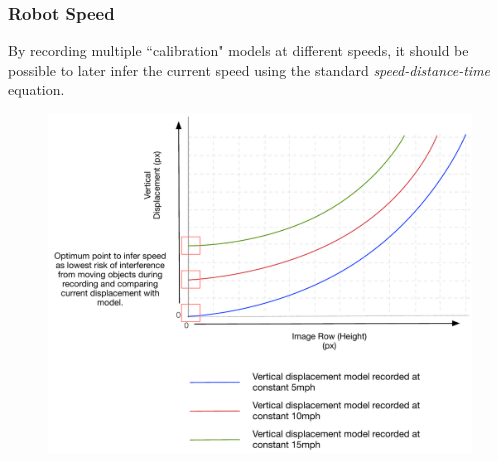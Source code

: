 \documentclass[10pt, compress]{beamer}
\begin{document}
\begin{frame}[fragile]
  \frametitle{Robot Speed}
  
\vspace{-10pt}

By recording multiple ``calibration" models at different speeds, it should be possible to later infer the current speed using the standard \textit{speed-distance-time} equation.

  \begin{figure}[ht!]
\centering
\includegraphics[scale=0.38]{speed_graph}
  \end{figure}
  
  
\end{frame}
\end{document}
